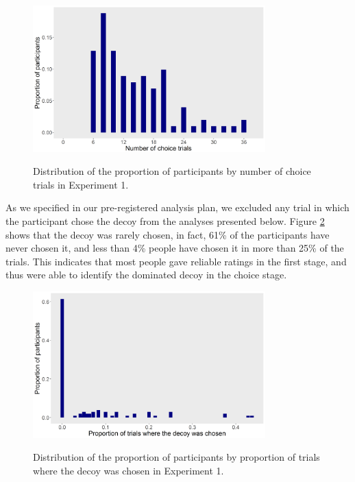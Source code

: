 \documentclass[11pt,a4paper]{article}
\begin{document}
\begin{figure}[htp!]
\captionsetup{justification=centering}
\centering
\caption{Distribution of the proportion of participants by number of choice trials in Experiment 1.}
\includegraphics[width=0.8\textwidth]{exp1_hist.png}
\label{fig:exp1_hist}
\end{figure}


As we specified in our pre-registered analysis plan, we excluded any trial in which the participant chose the decoy from the analyses presented below. Figure \ref{fig:exp1_decoytrials} shows that the decoy was rarely chosen, in fact, 61\% of the participants have never chosen it, and less than 4\% people have chosen it in more than 25\% of the trials. This indicates that most people gave reliable ratings in the first stage, and thus were able to identify the dominated decoy in the choice stage.


\begin{figure}
\captionsetup{justification=centering}
\centering
\caption{Distribution of the proportion of participants by proportion of trials where the decoy was chosen in Experiment 1.}
\includegraphics[width=0.8\textwidth]{exp1_decoytrials.png}
\label{fig:exp1_decoytrials}
\end{figure}
\end{document}
